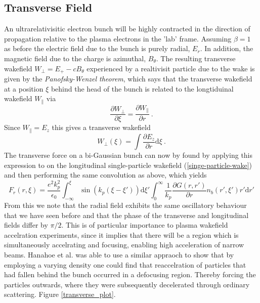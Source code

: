 \subsection{Transverse Field} 
An ultrarelativisitic electron bunch will be highly contracted in the direction of propagation relative to the plasma electrons in the 'lab' frame. Assuming $\beta=1$ as before the electric field due to the bunch is purely radial, $E_r$. In addition, the magnetic field due to the charge is azimuthal, $B_{\theta}$. The resulting transverse wakefield $W_{\perp}=E_+-cB_{\theta}$ experienced by a realtivisit particle due to the wake is given by the \textit{Panofsky-Wenzel theorem}\cite{Vaganian1995}, which says that the transverse wakefield at a position $\xi$ behind the head of the bunch is related to the longtiduinal wakefield $W_{\parallel}$ via
\begin{equation}
\frac{\partial W_{\perp} }{\partial \xi}=\frac{\partial W_{\parallel} }{\partial r}~.
\end{equation} 
Since $W_{\parallel} =E_z$ this gives a transverse wakefield
\begin{equation}
W_{\perp}(\xi)=\int \frac{\partial E_z }{\partial r}\mathrm{d}\xi~.
\end{equation}
The transverse force on a bi-Gaussian bunch can now by found by applying this expression to on the longitudinal single-particle wakefield (\ref{singe-particle-wake}) and then performing the same convolution as above, which yields 
\begin{equation}
F_r(r,\xi)=\frac{e^2 k_p^2}{\epsilon_0} \int_{-\infty}^{\xi} \sin(k_p(\xi-\xi'))\mathrm{d}\xi' \int_{0}^{\infty}\frac{1}{k_p}\frac{\partial G\left(r,r'\right)}{\partial r}  n_b(r',\xi')r'\mathrm{d}r'
\end{equation}
From this we note that the radial field exhibits the same oscillatory behaviour that we have seen before and that the phase of the transverse and longitudinal fields differ by $\pi/2$. This is of particular importance to plasma wakefield accelration experiments, since it implies that there will be a region which is simultaneously accelrating and focusing, enabling high acceleration of narrow beams. Hanahoe et al. was able to use a similar appraoch to show that by employing a varying density one could find that reaccelration of particles that had fallen behind the bunch occurred in a defocusing region. Thereby forcing the particles outwards, where they were subsequently decelerated through ordinary scattering. Figure \ref{transverse_plot}.\\
